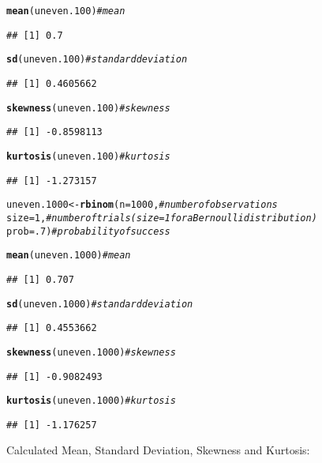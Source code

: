 \documentclass{article}\usepackage[]{graphicx}\usepackage[]{color}
\makeatletter
\newcommand{\hlnum}[1]{\textcolor[rgb]{0.686,0.059,0.569}{#1}}%
\newcommand{\hlcom}[1]{\textcolor[rgb]{0.678,0.584,0.686}{\textit{#1}}}%
\newcommand{\hlstd}[1]{\textcolor[rgb]{0.345,0.345,0.345}{#1}}%
\newcommand{\hlkwb}[1]{\textcolor[rgb]{0.69,0.353,0.396}{#1}}%
\newcommand{\hlkwc}[1]{\textcolor[rgb]{0.333,0.667,0.333}{#1}}%
\newcommand{\hlkwd}[1]{\textcolor[rgb]{0.737,0.353,0.396}{\textbf{#1}}}%
\newenvironment{kframe}{%
 \def\at@end@of@kframe{}%
 \ifinner\ifhmode%
  \def\at@end@of@kframe{\end{minipage}}%
  \begin{minipage}{\columnwidth}%
 \fi\fi%
 \def\FrameCommand##1{\hskip\@totalleftmargin \hskip-\fboxsep
 \colorbox{shadecolor}{##1}\hskip-\fboxsep
     \hskip-\linewidth \hskip-\@totalleftmargin \hskip\columnwidth}%
 \MakeFramed {\advance\hsize-\width
   \@totalleftmargin\z@ \linewidth\hsize
   \@setminipage}}%
 {\par\unskip\endMakeFramed%
 \at@end@of@kframe}
\newenvironment{knitrout}{}{} %
\makeatother
\begin{document}
\begin{enumerate}
\begin{enumerate}
\begin{knitrout}
\begin{kframe}
\begin{alltt}
\hlkwd{mean}\hlstd{(uneven.100)}                 \hlcom{#mean}
\end{alltt}
\begin{verbatim}
## [1] 0.7
\end{verbatim}
\begin{alltt}
\hlkwd{sd}\hlstd{(uneven.100)}                   \hlcom{#standard deviation}
\end{alltt}
\begin{verbatim}
## [1] 0.4605662
\end{verbatim}
\begin{alltt}
\hlkwd{skewness}\hlstd{(uneven.100)}             \hlcom{#skewness}
\end{alltt}
\begin{verbatim}
## [1] -0.8598113
\end{verbatim}
\begin{alltt}
\hlkwd{kurtosis}\hlstd{(uneven.100)}             \hlcom{#kurtosis}
\end{alltt}
\begin{verbatim}
## [1] -1.273157
\end{verbatim}
\begin{alltt}
\hlstd{uneven.1000} \hlkwb{<-} \hlkwd{rbinom}\hlstd{(}\hlkwc{n}\hlstd{=}\hlnum{1000}\hlstd{,}    \hlcom{#number of observations}
                    \hlkwc{size}\hlstd{=}\hlnum{1}\hlstd{,}      \hlcom{#number of trials (size=1 for a Bernoulli distribution)}
                    \hlkwc{prob}\hlstd{=}\hlnum{.7}\hlstd{)}     \hlcom{#probability of success}

\hlkwd{mean}\hlstd{(uneven.1000)}                \hlcom{#mean}
\end{alltt}
\begin{verbatim}
## [1] 0.707
\end{verbatim}
\begin{alltt}
\hlkwd{sd}\hlstd{(uneven.1000)}                  \hlcom{#standard deviation}
\end{alltt}
\begin{verbatim}
## [1] 0.4553662
\end{verbatim}
\begin{alltt}
\hlkwd{skewness}\hlstd{(uneven.1000)}            \hlcom{#skewness}
\end{alltt}
\begin{verbatim}
## [1] -0.9082493
\end{verbatim}
\begin{alltt}
\hlkwd{kurtosis}\hlstd{(uneven.1000)}            \hlcom{#kurtosis}
\end{alltt}
\begin{verbatim}
## [1] -1.176257
\end{verbatim}
\end{kframe}
\end{knitrout}
Calculated Mean, Standard Deviation, Skewness and Kurtosis:


\end{enumerate}
\end{enumerate}
\end{document}
